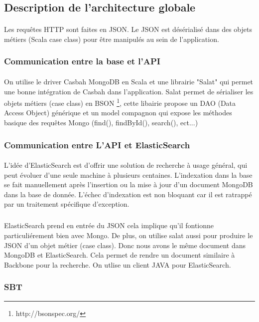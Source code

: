 \subsection{Description de l'architecture globale}
\paragraph{}
Les requêtes HTTP sont faites en JSON.
Le JSON est désérialisé dans des objets métiers 
(Scala case class) pour être manipulés au sein de l'application.
\subsubsection{Communication entre la base et l'API}
\paragraph{}
On utilise le driver Casbah MongoDB en Scala et une librairie "Salat" qui permet une bonne intégration de Casbah dans l'application.
Salat permet de sérialiser les objets métiers (case class) en BSON \footnote{http://bsonspec.org/}, cette libairie propose un DAO (Data Access Object) générique et un model compagnon qui expose les méthodes basique des requêtes Mongo (find(), findById(), search(), ect...)
\subsubsection{Communication entre L'API et ElasticSearch}
\paragraph{}
L’idée d’ElasticSearch est d’offrir une solution de recherche à usage général, qui peut évoluer d’une seule machine à plusieurs centaines.  
L'indexation dans la base se fait manuellement après l'insertion ou la mise à jour d'un document MongoDB dans la base de donnée.
L'échec d'indexation est non bloquant car il est ratrappé par un traitement spécifique d'exception.
\subparagraph{}
ElasticSearch prend en entrée du JSON cela implique qu'il fontionne particuliérement bien avec Mongo.
De plus, on utilise salat aussi pour produire le JSON d'un objet métier (case class).
Donc nous avons le même document dans MongoDB et ElasticSearch. Cela permet de rendre un document similaire à Backbone pour la recherche.
On utlise un client JAVA pour ElasticSearch.
\subsubsection{SBT}
